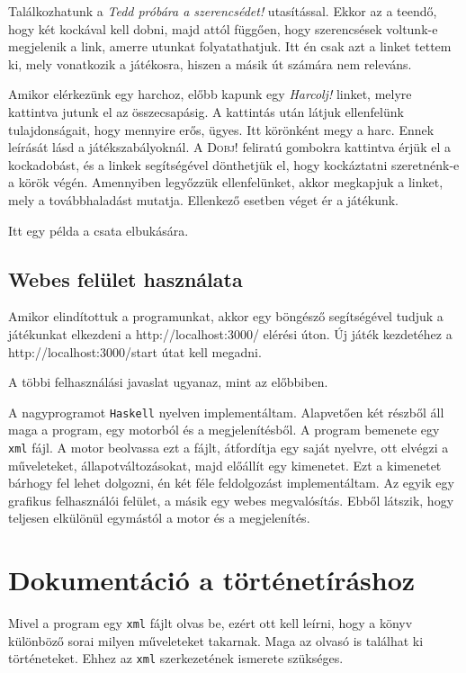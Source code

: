 \documentclass[12pt,a4paper,oneside]{report}
\newcommand{\stat}{\textsc}
\newcommand{\proglang}{\texttt}
\begin{document}
        Találkozhatunk a \emph{Tedd próbára a szerencsédet!}
        utasítással. Ekkor az a teendő, hogy két kockával kell dobni,
        majd attól függően, hogy szerencsések voltunk-e megjelenik a
        link, amerre utunkat folyatathatjuk. Itt én csak azt a linket
        tettem ki, mely vonatkozik a játékosra, hiszen a másik út
        számára nem releváns.

        Amikor elérkezünk egy harchoz, előbb kapunk egy \emph{Harcolj!}
        linket, melyre kattintva jutunk el az összecsapásig. A
        kattintás után látjuk ellenfelünk tulajdonságait, hogy
        mennyire erős, ügyes. Itt körönként megy a harc. Ennek
        leírását lásd a játékszabályoknál. A \stat{Dobj!} feliratú gombokra
        kattintva érjük el a kockadobást, és a linkek segítségével
        dönthetjük el, hogy kockáztatni szeretnénk-e a körök
        végén. Amennyiben legyőzzük ellenfelünket, akkor megkapjuk a
        linket, mely a továbbhaladást mutatja. Ellenkező esetben véget
        ér a játékunk.

        Itt egy példa a csata elbukására.
        
      \subsection{Webes felület használata}
        Amikor elindítottuk a programunkat, akkor egy böngésző
        segítségével tudjuk a játékunkat elkezdeni a
        http://localhost:3000/ elérési úton. Új játék kezdetéhez a
        http://localhost:3000/start útat kell megadni.

        A többi felhasználási javaslat ugyanaz, mint az előbbiben.
      
 A nagyprogramot \proglang{Haskell}
nyelven implementáltam. Alapvetően két részből áll maga a program, egy
motorból és a megjelenítésből. A program bemenete egy \proglang{xml}
fájl. A motor beolvassa ezt a fájlt, átfordítja egy saját nyelvre, ott
elvégzi a műveleteket, állapotváltozásokat, majd előállít egy
kimenetet. Ezt a kimenetet bárhogy fel lehet dolgozni, én két féle
feldolgozást implementáltam. Az egyik egy graf{}ikus felhasználói
felület, a másik egy webes megvalósítás. Ebből látszik, hogy teljesen
elkülönül egymástól a motor és a megjelenítés.

  \section{Dokumentáció a történetíráshoz}
    Mivel a program egy \proglang{xml} fájlt olvas be, ezért ott kell
    leírni, hogy a könyv különböző sorai milyen műveleteket
    takarnak. Maga az olvasó is találhat ki történeteket. Ehhez az
    \proglang{xml} szerkezetének ismerete szükséges.
\end{document}
